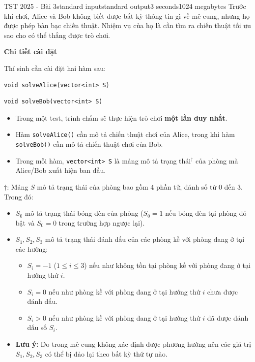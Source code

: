 \begin{problem}{TST 2025 - Bài 3}{standard input}{standard output}{3 seconds}{1024 megabytes}
Trước khi chơi, Alice và Bob không biết được bất kỳ thông tin gì về mê cung, nhưng họ được phép bàn bạc chiến thuật. Nhiệm vụ của họ là cần tìm ra chiến thuật tối ưu sao cho có thể thắng được trò chơi.

\InputFile
\textbf{Chi tiết cài đặt}

Thí sinh cần cài đặt hai hàm sau:

\begin{lstlisting}
void solveAlice(vector<int> S)
\end{lstlisting}

\begin{lstlisting}
void solveBob(vector<int> S)
\end{lstlisting}

\begin{itemize}
   \item Trong một test, trình chấm sẽ thực hiện trò chơi \textbf{một lần duy nhất}.
   \item Hàm \texttt{solveAlice()} cần mô tả chiến thuật chơi của Alice, trong khi hàm \texttt{solveBob()} cần mô tả chiến thuật chơi của Bob.
   \item Trong mỗi hàm, \texttt{vector<int> S} là mảng mô tả trạng thái$^{\dagger}$ của phòng mà Alice/Bob xuất hiện ban đầu.
\end{itemize}

$\dagger$: Mảng $S$ mô tả trạng thái của phòng bao gồm $4$ phần tử, đánh số từ $0$ đến $3$. Trong đó:
\begin{itemize}
   \item $S_0$ mô tả trạng thái bóng đèn của phòng ($S_0=1$ nếu bóng đèn tại phòng đó bật và $S_0=0$ trong trường hợp ngược lại).
   \item $S_1,S_2,S_3$ mô tả trạng thái đánh dấu của các phòng kề với phòng đang ở tại các hướng:
   \begin{itemize}
      \item $S_i=-1$ ($1\le i\le 3$) nếu như không tồn tại phòng kề với phòng đang ở tại hướng thứ $i$.
      \item $S_i=0$ nếu như phòng kề với phòng đang ở tại hướng thứ $i$ chưa được đánh dấu.
      \item $S_i>0$ nếu như phòng kề với phòng đang ở tại hướng thứ $i$ đã được đánh dấu số $S_i$.
   \end{itemize}
   \item \textbf{Lưu ý:} Do trong mê cung không xác định được phương hướng nên các giá trị $S_1,S_2,S_3$ có thể bị đảo lại theo bất kỳ thứ tự nào.
\end{itemize}


\end{problem}

